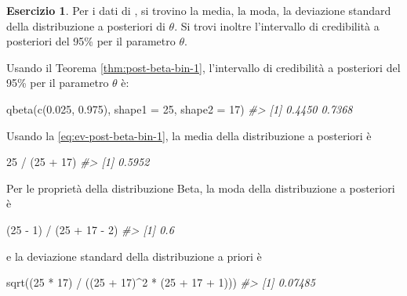 \documentclass[
  11pt,
]{krantz}
\makeatletter
\newenvironment{Shaded}{\begin{snugshade}}{\end{snugshade}}
\newcommand{\AttributeTok}[1]{\textcolor[rgb]{0.61,0.61,0.61}{#1}}
\newcommand{\CommentTok}[1]{\textcolor[rgb]{0.37,0.37,0.37}{\textit{#1}}}
\newcommand{\DecValTok}[1]{\textcolor[rgb]{0.06,0.06,0.06}{#1}}
\newcommand{\FloatTok}[1]{\textcolor[rgb]{0.06,0.06,0.06}{#1}}
\newcommand{\FunctionTok}[1]{\textcolor[rgb]{0,0,0}{#1}}
\newcommand{\NormalTok}[1]{#1}
\newcommand{\SpecialCharTok}[1]{\textcolor[rgb]{0,0,0}{#1}}
\newenvironment{kframe}{%
\medskip{}
\setlength{\fboxsep}{.8em}
 \def\at@end@of@kframe{}%
 \ifinner\ifhmode%
  \def\at@end@of@kframe{\end{minipage}}%
  \begin{minipage}{\columnwidth}%
 \fi\fi%
 \def\FrameCommand##1{\hskip\@totalleftmargin \hskip-\fboxsep
 \colorbox{shadecolor}{##1}\hskip-\fboxsep
     \hskip-\linewidth \hskip-\@totalleftmargin \hskip\columnwidth}%
 \MakeFramed {\advance\hsize-\width
   \@totalleftmargin\z@ \linewidth\hsize
   \@setminipage}}%
 {\par\unskip\endMakeFramed%
 \at@end@of@kframe}
\renewenvironment{Shaded}{\begin{kframe}}{\end{kframe}}
\theoremstyle{definition}
\theoremstyle{definition}
\theoremstyle{definition}
\newtheorem{exercise}{Esercizio}[chapter]
\theoremstyle{definition}
\theoremstyle{remark}
\makeatother
\begin{document}
\begin{exercise}

Per i dati di \citet{zetschefuture2019}, si trovino la media, la moda, la deviazione standard della distribuzione a posteriori di \(\theta\). Si trovi inoltre l'intervallo di credibilità a posteriori del 95\% per il parametro \(\theta\).

Usando il Teorema \ref{thm:post-beta-bin-1}, l'intervallo di credibilità a posteriori del 95\% per il parametro \(\theta\) è:

\begin{Shaded}
\begin{Highlighting}[]
\FunctionTok{qbeta}\NormalTok{(}\FunctionTok{c}\NormalTok{(}\FloatTok{0.025}\NormalTok{, }\FloatTok{0.975}\NormalTok{), }\AttributeTok{shape1 =} \DecValTok{25}\NormalTok{, }\AttributeTok{shape2 =} \DecValTok{17}\NormalTok{)}
\CommentTok{\#\textgreater{} [1] 0.4450 0.7368}
\end{Highlighting}
\end{Shaded}

Usando la \eqref{eq:ev-post-beta-bin-1}, la media della distribuzione a posteriori è

\begin{Shaded}
\begin{Highlighting}[]
\DecValTok{25} \SpecialCharTok{/}\NormalTok{ (}\DecValTok{25} \SpecialCharTok{+} \DecValTok{17}\NormalTok{)}
\CommentTok{\#\textgreater{} [1] 0.5952}
\end{Highlighting}
\end{Shaded}

Per le proprietà della distribuzione Beta, la moda della distribuzione a posteriori è

\begin{Shaded}
\begin{Highlighting}[]
\NormalTok{(}\DecValTok{25} \SpecialCharTok{{-}} \DecValTok{1}\NormalTok{) }\SpecialCharTok{/}\NormalTok{ (}\DecValTok{25} \SpecialCharTok{+} \DecValTok{17} \SpecialCharTok{{-}} \DecValTok{2}\NormalTok{)}
\CommentTok{\#\textgreater{} [1] 0.6}
\end{Highlighting}
\end{Shaded}

e la deviazione standard della distribuzione a priori è

\begin{Shaded}
\begin{Highlighting}[]
\FunctionTok{sqrt}\NormalTok{((}\DecValTok{25} \SpecialCharTok{*} \DecValTok{17}\NormalTok{) }\SpecialCharTok{/}\NormalTok{ ((}\DecValTok{25} \SpecialCharTok{+} \DecValTok{17}\NormalTok{)}\SpecialCharTok{\^{}}\DecValTok{2} \SpecialCharTok{*}\NormalTok{ (}\DecValTok{25} \SpecialCharTok{+} \DecValTok{17} \SpecialCharTok{+} \DecValTok{1}\NormalTok{)))}
\CommentTok{\#\textgreater{} [1] 0.07485}
\end{Highlighting}
\end{Shaded}

\end{exercise}
\end{document}
